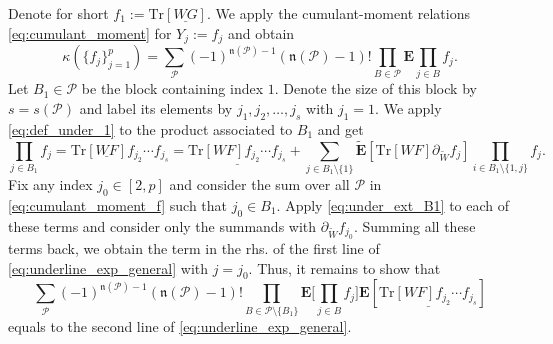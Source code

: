 \documentclass[10pt]{amsart}
\numberwithin{equation}{section}
\newcommand{\E}{\mathbf{E}}
\newcommand{\Tr}{\mathrm{Tr}}
\begin{document}
Denote for short $f_1:=\Tr[\underline{WG}]$. We apply the cumulant-moment relations \eqref{eq:cumulant_moment} for $Y_j:=f_j$ and obtain
\begin{equation}
\kappa\left(\{f_j\}_{j=1}^p\right) = \sum_{\mathcal{P}} (-1)^{\mathfrak{n}(\mathcal{P})-1}(\mathfrak{n}(\mathcal{P})-1)! \prod_{B\in \mathcal{P}} \E \prod_{j\in B} f_j.
\label{eq:cumulant_moment_f}
\end{equation}
Let $B_1\in\mathcal{P}$ be the block containing index $1$. Denote the size of this block by $s=s(\mathcal{P})$ and label its elements by $j_1,j_2,\ldots,j_s$ with $j_1=1$. We apply \eqref{eq:def_under_1} to the product associated to $B_1$ and get
\begin{equation}
\prod_{j\in B_1} f_j = \Tr[\underline{WF}] f_{j_2}\cdots f_{j_s} = \underline{\Tr[WF]f_{j_2}\cdots f_{j_s}} + \sum_{j\in B_1\setminus\{1\}} \widetilde{\E}\left[\Tr[WF] \partial_{\widetilde{W}} f_{j}\right] \prod_{i\in B_1\setminus\{1,j\}} f_j.
\label{eq:under_ext_B1}
\end{equation} 
Fix any index $j_0\in [2,p]$ and consider the sum over all $\mathcal{P}$ in \eqref{eq:cumulant_moment_f} such that $j_0\in B_1$. Apply \eqref{eq:under_ext_B1} to each of these terms and consider only the summands with $\partial_{\widetilde{W}}f_{j_0}$. Summing all these terms back, we obtain the term in the rhs. of the first line of \eqref{eq:underline_exp_general} with $j=j_0$. Thus, it remains to show that 
\begin{equation}
\sum_{\mathcal{P}} (-1)^{\mathfrak{n}(\mathcal{P})-1}(\mathfrak{n}(\mathcal{P})-1)! \prod_{B\in \mathcal{P}\setminus\{B_1\}} \E \bigg[\prod_{j\in B} f_j\bigg] \E\left[\underline{\Tr[WF]f_{j_2}\cdots f_{j_s}}\right]
\label{eq:full_underline_cumulant}
\end{equation}
equals to the second line of \eqref{eq:underline_exp_general}.
\end{document}
